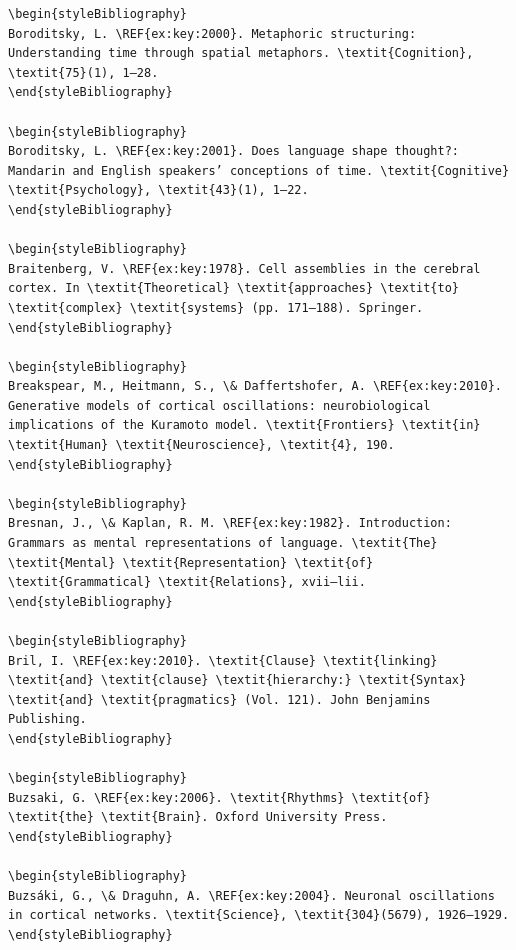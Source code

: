 \begin{verbatim}
\begin{styleBibliography}
Boroditsky, L. \REF{ex:key:2000}. Metaphoric structuring: Understanding time through spatial metaphors. \textit{Cognition}, \textit{75}(1), 1–28.
\end{styleBibliography}

\begin{styleBibliography}
Boroditsky, L. \REF{ex:key:2001}. Does language shape thought?: Mandarin and English speakers’ conceptions of time. \textit{Cognitive} \textit{Psychology}, \textit{43}(1), 1–22.
\end{styleBibliography}

\begin{styleBibliography}
Braitenberg, V. \REF{ex:key:1978}. Cell assemblies in the cerebral cortex. In \textit{Theoretical} \textit{approaches} \textit{to} \textit{complex} \textit{systems} (pp. 171–188). Springer.
\end{styleBibliography}

\begin{styleBibliography}
Breakspear, M., Heitmann, S., \& Daffertshofer, A. \REF{ex:key:2010}. Generative models of cortical oscillations: neurobiological implications of the Kuramoto model. \textit{Frontiers} \textit{in} \textit{Human} \textit{Neuroscience}, \textit{4}, 190.
\end{styleBibliography}

\begin{styleBibliography}
Bresnan, J., \& Kaplan, R. M. \REF{ex:key:1982}. Introduction: Grammars as mental representations of language. \textit{The} \textit{Mental} \textit{Representation} \textit{of} \textit{Grammatical} \textit{Relations}, xvii–lii.
\end{styleBibliography}

\begin{styleBibliography}
Bril, I. \REF{ex:key:2010}. \textit{Clause} \textit{linking} \textit{and} \textit{clause} \textit{hierarchy:} \textit{Syntax} \textit{and} \textit{pragmatics} (Vol. 121). John Benjamins Publishing.
\end{styleBibliography}

\begin{styleBibliography}
Buzsaki, G. \REF{ex:key:2006}. \textit{Rhythms} \textit{of} \textit{the} \textit{Brain}. Oxford University Press.
\end{styleBibliography}

\begin{styleBibliography}
Buzsáki, G., \& Draguhn, A. \REF{ex:key:2004}. Neuronal oscillations in cortical networks. \textit{Science}, \textit{304}(5679), 1926–1929.
\end{styleBibliography}


\end{verbatim}
